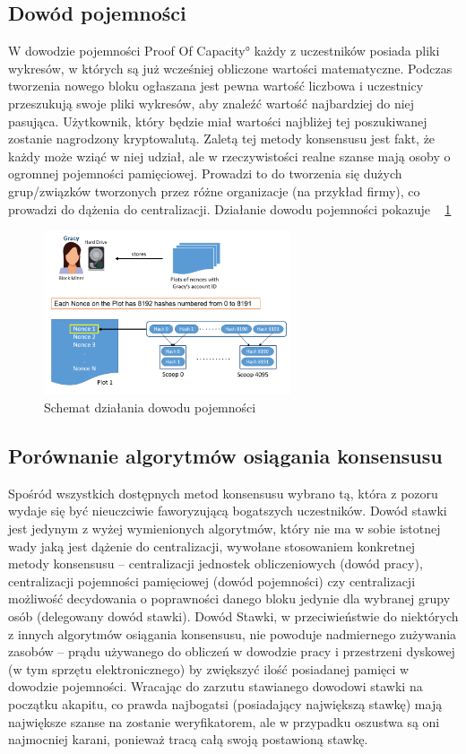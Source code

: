 \subsection{Dowód pojemności}
\label{ssec:PoC}
W dowodzie pojemności \ang{Proof Of Capacity} każdy z uczestników posiada pliki wykresów, w których są już wcześniej obliczone wartości matematyczne. Podczas tworzenia nowego bloku ogłaszana jest pewna wartość liczbowa i uczestnicy przeszukują swoje pliki wykresów, aby znaleźć wartość najbardziej do niej pasująca. Użytkownik, który będzie miał wartości najbliżej tej poszukiwanej zostanie nagrodzony kryptowalutą. Zaletą tej metody konsensusu jest fakt, że każdy może wziąć w niej udział, ale w rzeczywistości realne szanse mają osoby o ogromnej pojemności pamięciowej. Prowadzi to do tworzenia się dużych grup/związków tworzonych przez różne organizacje (na przykład firmy), co prowadzi do dążenia do centralizacji. Działanie dowodu pojemności pokazuje \figurename{~ \ref{fig:ConsensusPOC}}
\clearpage
\begin{figure}[ht]
    \centering
    \includegraphics[width=0.65\textwidth]{Images/ConsensusPOC.png}
    \caption{Schemat działania dowodu pojemności}
    \label{fig:ConsensusPOC}
\end{figure}

\subsection{Porównanie algorytmów osiągania konsensusu}
\label{ssec:KonsensusPorownanie}
Spośród wszystkich dostępnych metod konsensusu wybrano tą, która z pozoru wydaje się być nieuczciwie faworyzującą bogatszych uczestników. Dowód stawki jest jedynym z wyżej wymienionych algorytmów, który nie ma w sobie istotnej wady jaką jest dążenie do centralizacji, wywołane stosowaniem konkretnej metody konsensusu – centralizacji jednostek obliczeniowych (dowód pracy), centralizacji pojemności pamięciowej (dowód pojemności) czy centralizacji możliwość decydowania o poprawności danego bloku jedynie dla wybranej grupy osób (delegowany dowód stawki). Dowód Stawki, w przeciwieństwie do niektórych z innych algorytmów osiągania konsensusu, nie powoduje nadmiernego zużywania zasobów – prądu używanego do obliczeń w dowodzie pracy i przestrzeni dyskowej (w tym sprzętu elektronicznego) by zwiększyć ilość posiadanej pamięci w dowodzie pojemności. Wracając do zarzutu stawianego dowodowi stawki na początku akapitu, co prawda najbogatsi (posiadający największą stawkę) mają największe szanse na zostanie weryfikatorem, ale w przypadku oszustwa są oni najmocniej karani, ponieważ tracą całą swoją postawioną stawkę.

